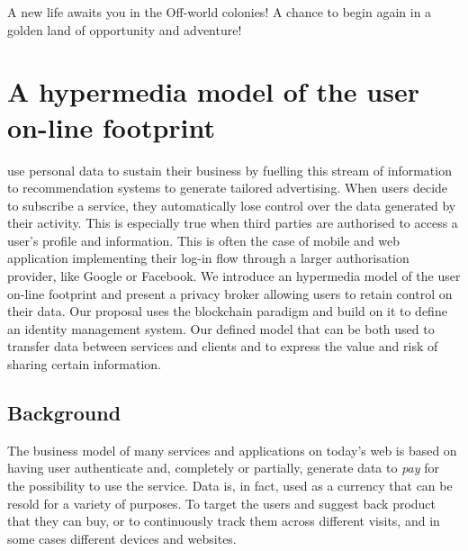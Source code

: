 \begin{savequote}[75mm]
A new life awaits you in the Off-world colonies! A chance to begin again in a golden land of opportunity and adventure!
\end{savequote}

\chapter{A hypermedia model of the user on-line footprint}

 use personal data to sustain their business by fuelling this stream of information to recommendation systems to generate tailored advertising. When users decide to subscribe a service, they automatically lose control over the data generated by their activity. This is especially true when third parties are authorised to access a user's profile and information. This is often the case of mobile and web application implementing their log-in flow through a larger authorisation provider, like Google or Facebook. We introduce an hypermedia model of the user on-line footprint and present a privacy broker allowing users to retain control on their data. Our proposal uses the blockchain paradigm and build on it to define an identity management system. Our defined model that can be both used to transfer data between services and clients and to express the value and risk of sharing certain information.

\section{Background}

The business model of many services and applications on today's web is based on having user authenticate and, completely or partially, generate data to \emph{pay} for the possibility to use the service. Data is, in fact, used as a currency that can be resold for a variety of purposes. To target the users and suggest back product that they can buy, or to continuously track them across different visits, and in some cases different devices and websites.

